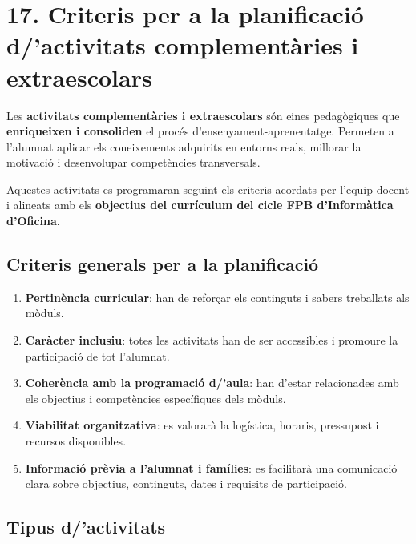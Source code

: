 \documentclass[
  paper=a4,
  ,captions=tableheading
]{scrartcl}
\providecommand{\tightlist}{%
  \setlength{\itemsep}{0pt}\setlength{\parskip}{0pt}}
\begin{document}
\hypertarget{criteris-per-a-la-planificaciuxf3-dactivitats-complementuxe0ries-i-extraescolars}{%
\section{17. Criteris per a la planificació d/'activitats
complementàries i
extraescolars}\label{criteris-per-a-la-planificaciuxf3-dactivitats-complementuxe0ries-i-extraescolars}}

Les \textbf{activitats complementàries i extraescolars} són eines
pedagògiques que \textbf{enriqueixen i consoliden} el procés
d'ensenyament-aprenentatge. Permeten a l'alumnat aplicar els
coneixements adquirits en entorns reals, millorar la motivació i
desenvolupar competències transversals.

Aquestes activitats es programaran seguint els criteris acordats per
l'equip docent i alineats amb els \textbf{objectius del currículum del
cicle FPB d'Informàtica d'Oficina}.

\hypertarget{criteris-generals-per-a-la-planificaciuxf3}{%
\subsection{Criteris generals per a la
planificació}\label{criteris-generals-per-a-la-planificaciuxf3}}

\begin{enumerate}
\def\labelenumi{\arabic{enumi}.}
\tightlist
\item
  \textbf{Pertinència curricular}: han de reforçar els continguts i
  sabers treballats als mòduls.
\item
  \textbf{Caràcter inclusiu}: totes les activitats han de ser
  accessibles i promoure la participació de tot l'alumnat.
\item
  \textbf{Coherència amb la programació d/'aula}: han d'estar
  relacionades amb els objectius i competències específiques dels
  mòduls.
\item
  \textbf{Viabilitat organitzativa}: es valorarà la logística, horaris,
  pressupost i recursos disponibles.
\item
  \textbf{Informació prèvia a l'alumnat i famílies}: es facilitarà una
  comunicació clara sobre objectius, continguts, dates i requisits de
  participació.
\end{enumerate}

\hypertarget{tipus-dactivitats}{%
\subsection{Tipus d/'activitats}\label{tipus-dactivitats}}
\end{document}
